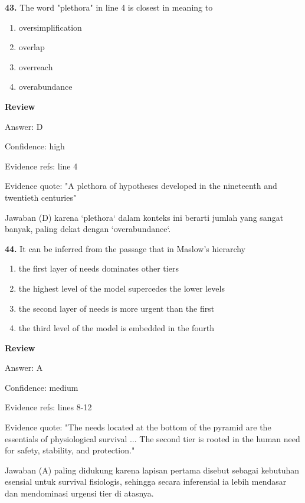 \documentclass[12pt]{article}
\begin{document}
\noindent\textbf{43.} The word "plethora" in line 4 is closest in meaning to
\begin{enumerate}[label=(\Alph*),leftmargin=*,itemsep=0.2em]
\item oversimplification
\item overlap
\item overreach
\item overabundance
\end{enumerate}
\par
\begingroup
\setlength{\parskip}{0pt}
\setlength{\parindent}{0pt}
\textbf{Review}\par
Answer: D\par
Confidence: high\par
Evidence refs: line 4\par
Evidence quote: "A plethora of hypotheses developed in the nineteenth and twentieth centuries"\par
Jawaban (D) karena `plethora` dalam konteks ini berarti jumlah yang sangat banyak, paling dekat dengan `overabundance`.\par
\endgroup
\par
\vspace{0.25\baselineskip}
\noindent\textbf{44.} It can be inferred from the passage that in Maslow's hierarchy
\begin{enumerate}[label=(\Alph*),leftmargin=*,itemsep=0.2em]
\item the first layer of needs dominates other tiers
\item the highest level of the model supercedes the lower levels
\item the second layer of needs is more urgent than the first
\item the third level of the model is embedded in the fourth
\end{enumerate}
\par
\begingroup
\setlength{\parskip}{0pt}
\setlength{\parindent}{0pt}
\textbf{Review}\par
Answer: A\par
Confidence: medium\par
Evidence refs: lines 8-12\par
Evidence quote: "The needs located at the bottom of the pyramid are the essentials of physiological survival ... The second tier is rooted in the human need for safety, stability, and protection."\par
Jawaban (A) paling didukung karena lapisan pertama disebut sebagai kebutuhan esensial untuk survival fisiologis, sehingga secara inferensial ia lebih mendasar dan mendominasi urgensi tier di atasnya.\par
\end{document}
